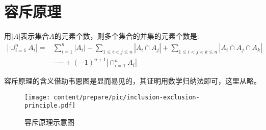 
\section{容斥原理}
\label{sec:inclusion-exclusion-principle}

\begin{principle}[容斥原理]
  用$|A|$表示集合$A$的元素个数，则多个集合的并集的元素个数是:
  \begin{equation}
    \label{eq:inclusion-exclusion-principle}
    \begin{split}
    |\cup_{i=1}^nA_i|= & \sum_{i=1}^n|A_i|-\sum_{1\leqslant i <j \leqslant n}|A_i \cap A_j|+\sum_{1 \leqslant i <j <k \leqslant n}|A_i\cap A_j \cap A_k| \\
 & -\cdots+(-1)^{n+1}|\cap_{i=1}^nA_i|
    \end{split}
  \end{equation}
\end{principle}
容斥原理的含义借助韦恩图是显而易见的，其证明用数学归纳法即可，这里从略。

\begin{figure}[htbp]
  \centering
\texttt{[image: content/prepare/pic/inclusion-exclusion-principle.pdf]}
\caption{容斥原理示意图}
\label{fig:inclusion-exclusion-principle}
\end{figure}


